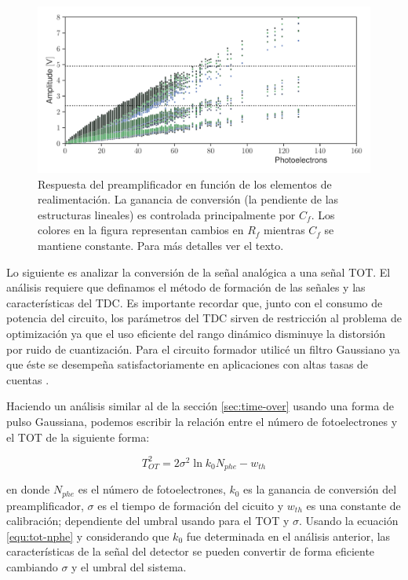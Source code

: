 \begin{figure}
        \centering
        \includegraphics[width=\textwidth]{phe-cal.pdf}
        \caption{Respuesta del preamplificador en función de los elementos de realimentación. La ganancia de conversión (la pendiente de las estructuras lineales) es controlada principalmente por $C_{f}$. Los colores en la figura representan cambios en $R_{f}$ mientras $C_{f}$ se mantiene constante. Para más detalles ver el texto.}
        \label{fig:phe-cal}
\end{figure}

Lo siguiente es analizar la conversión de la señal analógica a una señal TOT. El análisis requiere que definamos el método de formación de las señales y las características del TDC. Es importante recordar que,  junto con el consumo de potencia del circuito, los parámetros del TDC sirven de restricción al problema de optimización ya que el uso eficiente del rango dinámico disminuye la distorsión por ruido de cuantización. Para el circuito formador utilicé un filtro Gaussiano ya que éste se desempeña satisfactoriamente en aplicaciones con altas tasas de cuentas \cite{ohkawa76}.

Haciendo un análisis similar al de la sección \ref{sec:time-over} usando una forma de pulso Gaussiana, podemos escribir la relación entre el número de fotoelectrones y el TOT de la siguiente forma:

\begin{equation}
\label{equ:tot-nphe}
T_{OT}^{2}=2\sigma^{2}\ln{k_{0} N_{phe}}-w_{th}
\end{equation}

en donde $N_{phe}$ es el número de fotoelectrones, $k_{0}$ es la ganancia de conversión del preamplificador, $\sigma$ es el tiempo de formación del cicuito y $w_{th}$ es una constante de calibración; dependiente del umbral usando para el TOT y $\sigma$. Usando la ecuación \ref{equ:tot-nphe} y considerando que $k_{0}$ fue determinada en el análisis anterior, las características de la señal del detector se pueden convertir de forma eficiente cambiando $\sigma$ y el umbral del sistema.

